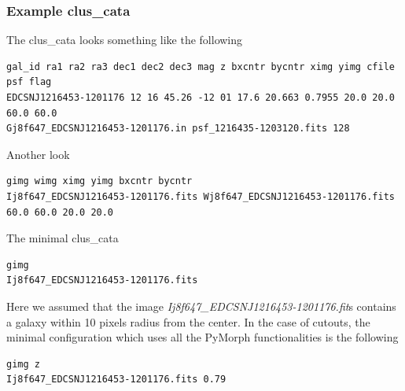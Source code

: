 \documentclass[a4paper,10pt]{article}
\begin{document}
\subsubsection*{Example clus\_cata}
The clus\_cata looks something like the following
\begin{footnotesize}
\begin{verbatim}
gal_id ra1 ra2 ra3 dec1 dec2 dec3 mag z bxcntr bycntr ximg yimg cfile psf flag
EDCSNJ1216453-1201176 12 16 45.26 -12 01 17.6 20.663 0.7955 20.0 20.0 60.0 60.0 
Gj8f647_EDCSNJ1216453-1201176.in psf_1216435-1203120.fits 128
\end{verbatim}
\end{footnotesize}
Another look
\begin{footnotesize}
\begin{verbatim}
gimg wimg ximg yimg bxcntr bycntr
Ij8f647_EDCSNJ1216453-1201176.fits Wj8f647_EDCSNJ1216453-1201176.fits 60.0 60.0 20.0 20.0
\end{verbatim}
\end{footnotesize}
The minimal clus\_cata
\begin{footnotesize}
\begin{verbatim}
gimg
Ij8f647_EDCSNJ1216453-1201176.fits
\end{verbatim}
\end{footnotesize}
Here we assumed that the image \textit{Ij8f647\_EDCSNJ1216453-1201176.fit}s contains a galaxy within 10 pixels
 radius from the center. In the case of cutouts, the minimal configuration which uses all the PyMorph functionalities is the following
\begin{footnotesize}
\begin{verbatim}
gimg z
Ij8f647_EDCSNJ1216453-1201176.fits 0.79
\end{verbatim}
\end{footnotesize}
\end{document}
